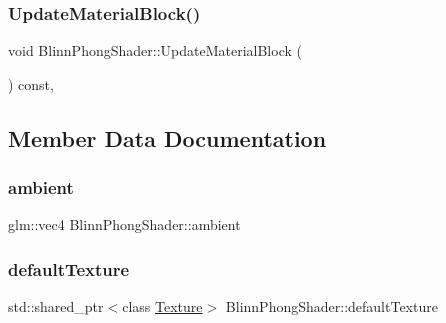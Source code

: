 \hypertarget{class_blinn_phong_shader_aa247270120b46431b436220ea6e777be}{}\label{class_blinn_phong_shader_aa247270120b46431b436220ea6e777be} 
\subsubsection{\texorpdfstring{Update\+Material\+Block()}{UpdateMaterialBlock()}}
{\footnotesize\ttfamily void Blinn\+Phong\+Shader\+::\+Update\+Material\+Block (\begin{DoxyParamCaption}{ }\end{DoxyParamCaption}) const\hspace{0.3cm}{\ttfamily [protected]}, {\ttfamily [virtual]}}



\subsection{Member Data Documentation}
\hypertarget{class_blinn_phong_shader_af612b03df22b2bc9e37dcd85124ee9d2}{}\label{class_blinn_phong_shader_af612b03df22b2bc9e37dcd85124ee9d2} 
\subsubsection{\texorpdfstring{ambient}{ambient}}
{\footnotesize\ttfamily glm\+::vec4 Blinn\+Phong\+Shader\+::ambient\hspace{0.3cm}{\ttfamily [protected]}}

\hypertarget{class_blinn_phong_shader_a2335cf5c2d95098a94f9f2e888b329f3}{}\label{class_blinn_phong_shader_a2335cf5c2d95098a94f9f2e888b329f3} 
\subsubsection{\texorpdfstring{default\+Texture}{defaultTexture}}
{\footnotesize\ttfamily std\+::shared\+\_\+ptr$<$class \hyperlink{class_texture}{Texture}$>$ Blinn\+Phong\+Shader\+::default\+Texture\hspace{0.3cm}{\ttfamily [private]}}

